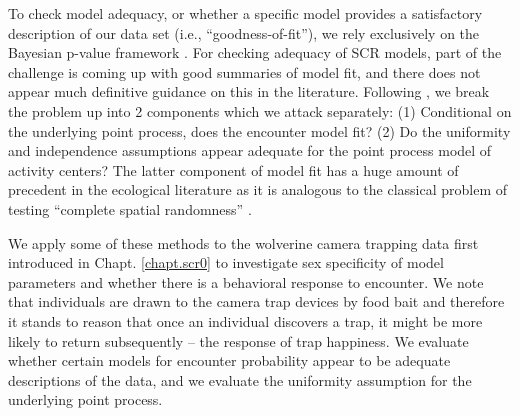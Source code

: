  To check model adequacy, or whether a
specific model provides a satisfactory description of our data set
(i.e., ``goodness-of-fit''), we rely exclusively on the Bayesian
p-value framework \citep{gelman_etal:1996}.  For checking adequacy of
SCR models, part of the challenge is coming up with good summaries of
model fit, and there does not appear much definitive guidance on this
in the literature.  Following \citet{royle_etal:2011mee}, we break the
problem up into 2 components which we attack separately: (1)
Conditional on the underlying point process, does the encounter model
fit? (2) Do the uniformity and independence assumptions appear
adequate for the point process model of activity centers? The latter
component of model fit has a huge amount of precedent in the
ecological literature as it is analogous to the classical problem of
testing ``complete spatial randomness'' \citep{cressie:1992, illian_etal:2008}.


We apply some of these methods to the wolverine camera trapping
data first introduced in Chapt. \ref{chapt.scr0}
to investigate sex specificity of model parameters and whether
there is a behavioral response to encounter. We note that individuals
are drawn to the camera trap devices by food bait and therefore it
stands to reason that once an individual discovers a trap, it  might
be more likely to return subsequently -- the response of
trap happiness. We evaluate whether certain models for encounter
probability  appear to be
adequate descriptions of the data, and we evaluate the uniformity
assumption for the underlying point process.



\begin{comment}
A basic problem with these two objectives of model selection and model
assessment is their simultaneous use implies a kind of contradiction
which we call the {\it model selectors paradox}: Inferences are always
achieved using standard paradigms of parametric inference (Bayesian or
frequentist) which assert that the model is properly specified. That
is, we assume that the model is truth. This is paradoxical because we
all know that ``all models are wrong'' but, possibly, ``some are
useful.'' In fact, the notion that an ``assumption'' could even be
correct is itself something of an oxymoron.
\end{comment}

\begin{comment}
  Therefore we don't expect
or hope to make assumptions that are ``correct'' in any way. Gelman
and Shalizi (2010) say it this way: ``there is general agreement that,
in this domain, all models in use are wrong -- not just merely
falsifiable, but actually false.''  We should therefore refrain from
over-stating the relevance of any model.  [not sure where I was going
with this point]
\end{comment}



